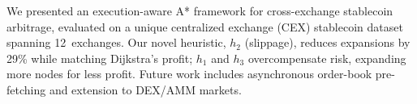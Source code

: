 We presented an execution-aware A* framework for cross-exchange stablecoin arbitrage, evaluated on a unique centralized exchange (CEX) stablecoin dataset spanning 12~exchanges. Our novel heuristic, $h_2$ (slippage), reduces expansions by 29\% while matching Dijkstra's profit; $h_1$ and $h_3$ overcompensate risk, expanding more nodes for less profit. Future work includes asynchronous order-book pre-fetching and extension to DEX/AMM markets.
